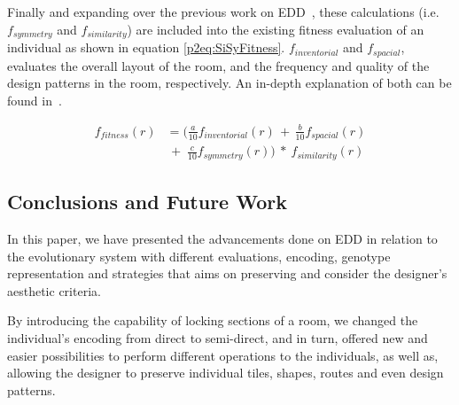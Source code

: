 Finally and expanding over the previous work on EDD~, these calculations (i.e. \(f_{symmetry}\) and \(f_{similarity}\)) are included into the existing fitness evaluation of an individual as shown in equation \ref{p2eq:SiSyFitness}. \(f_{inventorial}\) and \(f_{spacial}\), evaluates the overall layout of the room, and the frequency and quality of the design patterns in the room, respectively. An in-depth explanation of both can be found in~.


\begin{equation} \label{p2eq:SiSyFitness}
\begin{split}
f_{fitness}(r) & = (\frac{a}{10}f_{inventorial}(r) \,+ \, \frac{b}{10}f_{spacial}(r) \\ 
 & \, + \; \frac{c}{10}f_{symmetry}(r)) \ * \ f_{similarity}(r)
\end{split}
\end{equation}

\subsection{Conclusions and Future Work} \label{p2conclusion}

In this paper, we have presented the advancements done on EDD in relation to the evolutionary system with different evaluations, encoding, genotype representation and strategies that aims on preserving and consider the designer's aesthetic criteria.

By introducing the capability of locking sections of a room, we changed the individual's encoding from direct to semi-direct, and in turn, offered new and easier possibilities to perform different operations to the individuals, as well as, allowing the designer to preserve individual tiles, shapes, routes and even design patterns.


